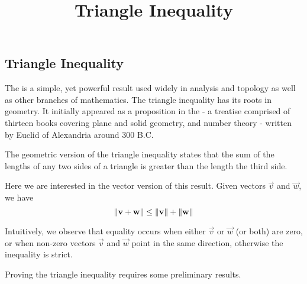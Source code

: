 \documentclass{ximera}
\title{Triangle Inequality} \license{CC BY-NC-SA 4.0}
\begin{document}
\begin{abstract}
 
\end{abstract}
\maketitle

\begin{onlineOnly}
\section*{Triangle Inequality}
\end{onlineOnly}

The  is a simple, yet powerful result used widely in analysis and topology as well as other branches of mathematics.  The triangle inequality has its roots in geometry. It initially appeared as a proposition in the  - a treatise comprised of thirteen books covering plane and solid geometry, and number theory - written by Euclid of Alexandria around 300 B.C.

The geometric version of the triangle inequality states that the sum of the lengths of any two sides of a triangle is greater than the length the third side.  

Here we are interested in the vector version of this result.  Given vectors $\vec{v}$ and $\vec{w}$, we have
$$\left\lVert\mathbf{v}+\mathbf{w}\right\rVert\leq\left\lVert\mathbf{v}\right\rVert+\left\lVert\mathbf{w}\right\rVert$$

\begin{center}
\end{center}

Intuitively, we observe that equality occurs when either $\vec{v}$ or $\vec{w}$ (or both) are zero, or when non-zero vectors $\vec{v}$ and $\vec{w}$ point in the same direction, otherwise the inequality is strict.

Proving the triangle inequality requires some preliminary results.
\end{document}

